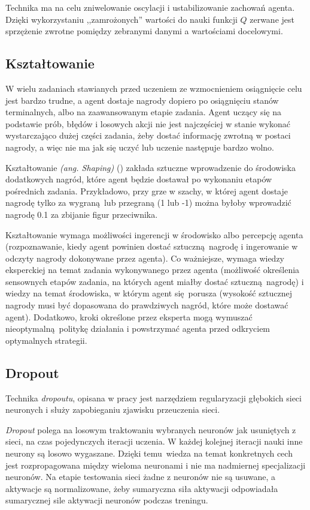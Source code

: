 Technika ma na celu zniwelowanie oscylacji i ustabilizowanie zachowań agenta. Dzięki wykorzystaniu ,,zamrożonych'' wartości do nauki funkcji $Q$ zerwane jest sprzężenie zwrotne pomiędzy zebranymi danymi a wartościami docelowymi.

\subsection{Kształtowanie}\label{shaping}
W wielu zadaniach stawianych przed uczeniem ze wzmocnieniem osiągnięcie celu jest bardzo trudne, a agent dostaje nagrody dopiero po osiągnięciu stanów terminalnych, albo na zaawansowanym etapie zadania. Agent uczący się na podstawie prób, błędów i losowych akcji nie jest najczęściej w stanie wykonać wystarczająco dużej części zadania, żeby dostać informację zwrotną w postaci nagrody, a więc nie ma jak się uczyć lub uczenie następuje bardzo wolno.

Kształtowanie \textit{(ang. Shaping)} (\cite{Mataric94rewardfunctions}) zakłada sztuczne wprowadzenie do środowiska dodatkowych nagród, które agent będzie dostawał po wykonaniu etapów pośrednich zadania. Przykładowo, przy grze w szachy, w której agent dostaje nagrodę tylko za wygraną lub przegraną (1 lub -1) można byłoby wprowadzić nagrodę 0.1 za zbijanie figur przeciwnika.

Kształtowanie wymaga możliwości ingerencji w środowisko albo percepcję agenta (rozpoznawanie, kiedy agent powinien dostać sztuczną nagrodę i ingerowanie w odczyty nagrody dokonywane przez agenta). Co ważniejsze, wymaga wiedzy eksperckiej na temat zadania wykonywanego przez agenta (możliwość określenia sensownych etapów zadania, na których agent miałby dostać sztuczną nagrodę) i wiedzy na temat środowiska, w którym agent się porusza (wysokość sztucznej nagrody musi być dopasowana do prawdziwych nagród, które może dostawać agent). Dodatkowo, kroki określone przez eksperta mogą wymuszać nieoptymalną politykę działania i powstrzymać agenta przed odkryciem optymalnych strategii.

\subsection{Dropout}\label{dropout}

Technika \textit{dropoutu}, opisana w pracy \cite{Srivastava:2014:DSW:2627435.2670313} jest narzędziem regularyzacji głębokich sieci neuronych i służy zapobieganiu zjawisku przeuczenia sieci.

\textit{Dropout} polega na losowym traktowaniu wybranych neuronów jak usuniętych z sieci, na czas pojedynczych iteracji uczenia. W każdej kolejnej iteracji nauki inne neurony są losowo wygaszane. Dzięki temu wiedza na temat konkretnych cech jest rozpropagowana między wieloma neuronami i nie ma nadmiernej specjalizacji neuronów. Na etapie testowania sieci żadne z neuronów nie są usuwane, a aktywacje są normalizowane, żeby sumaryczna siła aktywacji odpowiadała sumarycznej sile aktywacji neuronów podczas treningu.

